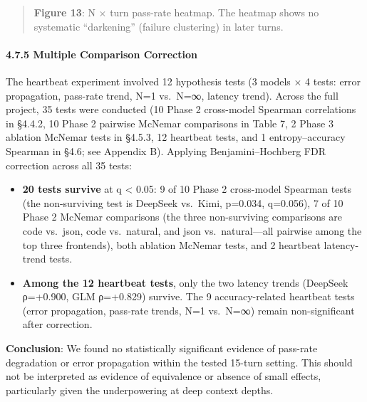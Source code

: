 \begin{quote}

\textbf{Figure 13}: N × turn pass-rate heatmap. The heatmap shows no systematic ``darkening'' (failure clustering) in later turns.

\end{quote}



\paragraph{4.7.5 Multiple Comparison Correction}\label{multiple-comparison-correction}



The heartbeat experiment involved 12 hypothesis tests (3 models × 4 tests: error propagation, pass-rate trend, N=1 vs.~N=∞, latency trend). Across the full project, 35 tests were conducted (10 Phase 2 cross-model Spearman correlations in §4.4.2, 10 Phase 2 pairwise McNemar comparisons in Table 7, 2 Phase 3 ablation McNemar tests in §4.5.3, 12 heartbeat tests, and 1 entropy--accuracy Spearman in §4.6; see Appendix B). Applying Benjamini--Hochberg FDR correction across all 35 tests:



\begin{itemize}

\tightlist

\item

  \textbf{20 tests survive} at q \textless{} 0.05: 9 of 10 Phase 2 cross-model Spearman tests (the non-surviving test is DeepSeek vs.~Kimi, p=0.034, q=0.056), 7 of 10 Phase 2 McNemar comparisons (the three non-surviving comparisons are code vs.~json, code vs.~natural, and json vs.~natural---all pairwise among the top three frontends), both ablation McNemar tests, and 2 heartbeat latency-trend tests.

\item

  \textbf{Among the 12 heartbeat tests}, only the two latency trends (DeepSeek ρ=+0.900, GLM ρ=+0.829) survive. The 9 accuracy-related heartbeat tests (error propagation, pass-rate trends, N=1 vs.~N=∞) remain non-significant after correction.

\end{itemize}



\textbf{Conclusion}: We found no statistically significant evidence of pass-rate degradation or error propagation within the tested 15-turn setting. This should not be interpreted as evidence of equivalence or absence of small effects, particularly given the underpowering at deep context depths.



